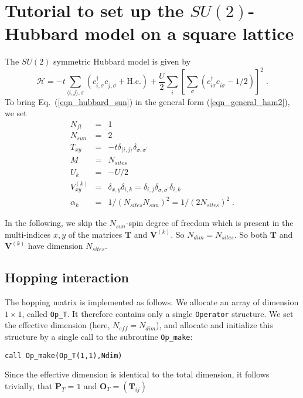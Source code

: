 \section{Tutorial to set up the $SU(2)$-Hubbard model on a square lattice}
The $SU(2)$ symmetric Hubbard model is given by
\begin{equation}
\label{eqn_hubbard_sun}
\mathcal{H}=
-t\sum\limits_{\langle i,j\rangle,\sigma} 
\left(c^{\dagger}_{i,\sigma} c^{\phantom\dagger}_{j,\sigma} + \text{H.c.}
\right)
+ \frac{U}{2}\sum\limits_{i}\left[
\sum\limits_{\sigma}
\left(  c^{\dagger}_{i\sigma} c^{\phantom\dagger}_{i\sigma}  -1/2 \right) \right]^{2}\;.
\end{equation}
To bring Eq.~(\ref{eqn_hubbard_sun}) in the general form (\ref{eqn_general_ham2}), we set
\begin{eqnarray}
N_{fl}&=&1\nonumber\\
N_{sun}&=&2\nonumber\\
T_{x y}&=&-t\delta_{\langle i,j\rangle}\delta_{\sigma,\sigma^{\prime}}\nonumber\\
M&=&N_{sites}\nonumber\\
U_{k}&=&-U/2\nonumber\\
V_{x y}^{(k)}&=&
\delta_{x,y}\delta_{i,k}=
\delta_{i,j}\delta_{\sigma,\sigma^{\prime}}\delta_{i,k}\nonumber\\
\alpha_{k}&=&1/(N_{sites}N_{sun})^{2}=1/(2 N_{sites})^{2}\;.
\end{eqnarray}

In the following, we skip the $N_{sun}$-spin degree of freedom which is present in the multi-indices $x,y$ of the matrices $\bm{T}$ and ${\bm V}^{(k)}$. 
So $N_{dim}=N_{sites}$. 
So both $\bm{T}$ and ${\bm V}^{(k)}$  have dimension $N_{sites}$.

\subsection{Hopping interaction}
The hopping matrix is implemented as follows. 
We allocate an array of dimension $1\times 1$, called \texttt{Op\_T}. It therefore contains only a single \texttt{Operator} structure.
We set the effective dimension (here, $N_{eff}=N_{dim}$), and allocate and initialize this structure by a single call to the subroutine \texttt{Op\_make}: 
\begin{verbatim}
call Op_make(Op_T(1,1),Ndim)
\end{verbatim}
Since the effective dimension is identical to the total dimension, it follows trivially, that ${\bm P}_{T}=\mathds{1}$ and ${\bm O}_{T}=({\bm T}_{ij})$ 

